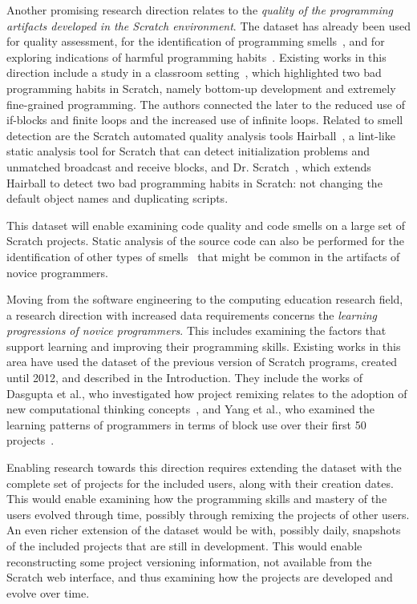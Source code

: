 \documentclass[10pt, conference]{IEEEtran}
\begin{document}
Another promising research direction relates to the \textit{quality of the programming artifacts developed in the Scratch environment}.
The dataset has already been used for quality assessment, for the identification of programming smells~\cite{Aivaloglou_2016}, and for exploring indications of harmful programming habits~\cite{Robles_2017}.
Existing works in this direction include a study in a classroom setting~\cite{Meerbaum_habits_2011}, which highlighted two bad programming habits in Scratch, namely bottom-up development and extremely fine-grained programming.
The authors connected the later to the reduced use of if-blocks and finite loops and the increased use of infinite loops.
Related to smell detection are the Scratch automated quality analysis tools Hairball~\cite{boe_hairball:_2013}, a lint-like static analysis tool for Scratch that can detect initialization problems and unmatched broadcast and receive blocks, and Dr. Scratch~\cite{moreno-leon_dr._2015}, which extends Hairball to detect two bad programming habits in Scratch: not changing the default object names and duplicating scripts.

This dataset will enable examining code quality and code smells on a large set of Scratch projects.
Static analysis of the source code can also be performed for the identification of other types of smells~\cite{fowler_refactoring:_1999} that might be common in the artifacts of novice programmers.

Moving from the software engineering to the computing education research field, a research direction with increased data requirements concerns the \textit{learning progressions of novice programmers}.
This includes examining the factors that support learning and improving their programming skills.
Existing works in this area have used the dataset of the previous version of Scratch programs, created until 2012, and described in the Introduction.
They include the works of Dasgupta et al., who investigated how project remixing relates to the adoption of new computational thinking concepts~\cite{Dasgupta_2016}, and Yang et al., who examined the learning patterns of programmers in terms of block use over their first 50 projects~\cite{yang_2015}.

Enabling research towards this direction requires extending the dataset with the complete set of projects for the included users, along with their creation dates.
This would enable examining how the programming skills and mastery of the users evolved through time, possibly through remixing the projects of other users.
An even richer extension of the dataset would be with, possibly daily, snapshots of the included projects that are still in development.
This would enable reconstructing some project versioning information, not available from the Scratch web interface, and thus examining how the projects are developed and evolve over time.
\end{document}
